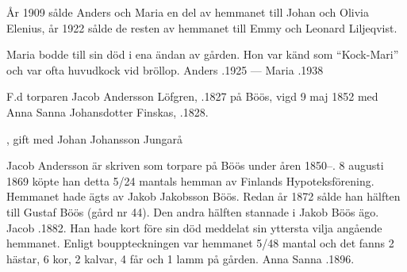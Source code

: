 År 1909 sålde Anders och Maria en del av hemmanet till Johan och Olivia Elenius, år 1922 sålde de resten av hemmanet till Emmy och Leonard Liljeqvist.

Maria bodde till sin död i ena ändan av gården. Hon var känd som ``Kock-Mari'' och var ofta huvudkock vid bröllop.
Anders .1925  ---  Maria .1938


F.d torparen Jacob Andersson Löfgren, .1827 på Böös, vigd 9 maj 1852 med Anna Sanna Johansdotter Finskas, .1828.
\begin{jhchildren}
  \item {}
  \item {}
  \item {}
  \item {}
  \item {}
  \item {}
  \item {}, gift med Johan Johansson Jungarå
  \item {}
\end{jhchildren}
Jacob Andersson är skriven som torpare på Böös under åren 1850--. 8 augusti 1869 köpte han detta 5/24 mantals hemman av Finlands Hypoteksförening. Hemmanet hade ägts av Jakob Jakobsson Böös. Redan år 1872 sålde han hälften till Gustaf Böös (gård nr 44). Den andra hälften stannade i Jakob Böös ägo. Jacob .1882. Han hade kort före sin död meddelat sin yttersta vilja angående hemmanet. Enligt bouppteckningen var hemmanet 5/48 mantal och det fanns 2 hästar, 6 kor, 2 kalvar, 4 får och 1 lamm på gården. Anna Sanna .1896.


